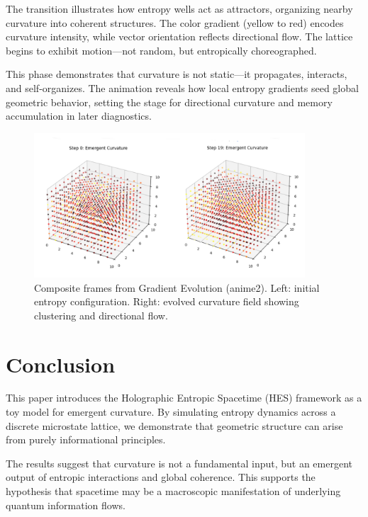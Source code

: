 \documentclass[12pt]{article}
\begin{document}
The transition illustrates how entropy wells act as attractors, organizing nearby curvature into coherent structures. The color gradient (yellow to red) encodes curvature intensity, while vector orientation reflects directional flow. The lattice begins to exhibit motion—not random, but entropically choreographed.

This phase demonstrates that curvature is not static—it propagates, interacts, and self-organizes. The animation reveals how local entropy gradients seed global geometric behavior, setting the stage for directional curvature and memory accumulation in later diagnostics.

\begin{figure}[h]
    \centering
    \includegraphics[width=0.9\textwidth]{figures/Figure_7.PNG}
    \caption{Composite frames from Gradient Evolution (anime2). Left: initial entropy configuration. Right: evolved curvature field showing clustering and directional flow.}
    \label{fig:gradient_evolution}
\end{figure}






\section{Conclusion}

This paper introduces the Holographic Entropic Spacetime (HES) framework as a toy model for emergent curvature. By simulating entropy dynamics across a discrete microstate lattice, we demonstrate that geometric structure can arise from purely informational principles.

The results suggest that curvature is not a fundamental input, but an emergent output of entropic interactions and global coherence. This supports the hypothesis that spacetime may be a macroscopic manifestation of underlying quantum information flows.
\end{document}
